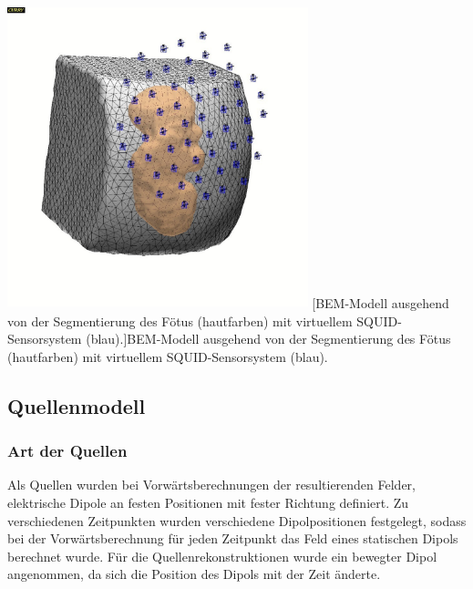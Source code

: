 \begin{center}
\includegraphics[width=8.721cm,height=8.784cm]{BA-img/BA-img9.pdf}
[BEM{}-Modell ausgehend von der Segmentierung des
Fötus (hautfarben) mit virtuellem SQUID{}-Sensorsystem
(blau).]{BEM-Modell ausgehend von der Segmentierung des Fötus
(hautfarben) mit virtuellem SQUID-Sensorsystem (blau).}

\end{center}
\subsection{Quellenmodell}
\subsubsection{Art der Quellen}
Als Quellen wurden bei Vorwärtsberechnungen der resultierenden Felder,
elektrische Dipole an festen Positionen mit fester Richtung definiert.
Zu verschiedenen Zeitpunkten wurden verschiedene Dipolpositionen
festgelegt, sodass bei der Vorwärtsberechnung für jeden Zeitpunkt das
Feld eines statischen Dipols berechnet wurde. Für die
Quellenrekonstruktionen wurde ein bewegter Dipol angenommen, da sich
die Position des Dipols mit der Zeit änderte. 

